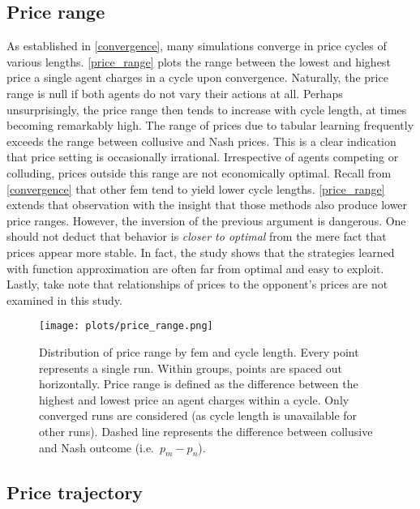 \subsection{Price range}\label{prices}

As established in \autoref{convergence}, many simulations converge in price cycles of various lengths. \autoref{price_range} plots the range between the lowest and highest price a single agent charges in a cycle upon convergence. Naturally, the price range is null if both agents do not vary their actions at all. Perhaps unsurprisingly, the price range then tends to increase with cycle length, at times becoming remarkably high. The range of prices due to tabular learning frequently exceeds the range between collusive and Nash prices. This is a clear indication that price setting is occasionally irrational. Irrespective of agents competing or colluding, prices outside this range are not economically optimal. Recall from \autoref{convergence} that other \gls{fem} tend to yield lower cycle lengths. \autoref{price_range} extends that observation with the insight that those methods also produce lower price ranges. However, the inversion of the previous argument is dangerous. One should not deduct that behavior is \emph{closer to optimal} from the mere fact that prices appear more stable. In fact, the study shows that the strategies learned with function approximation are often far from optimal and easy to exploit. Lastly, take note that relationships of prices to the opponent's prices are not examined in this study.

\begin{figure}
	\texttt{[image: plots/price\_range.png]}
	\caption[Distribution of price range by \gls{fem} and cycle length]{Distribution of price range by \gls{fem} and cycle length. Every point represents a single run. Within groups, points are spaced out horizontally. Price range is defined as the difference between the highest and lowest price an agent charges within a cycle. Only converged runs are considered (as cycle length is unavailable for other runs). Dashed line represents the difference between collusive and Nash outcome (i.e.\ $p_m - p_n$).}
	\label{price_range}
\end{figure}

\pagebreak

\subsection{Price trajectory}\label{trajectory_prices_section}

